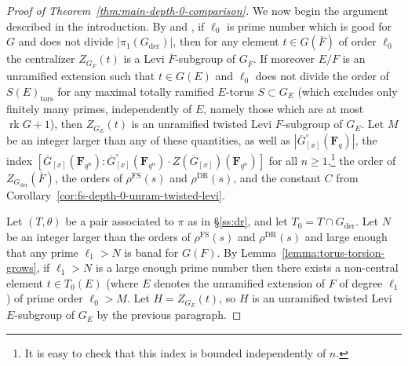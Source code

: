 \documentclass[reqno]{amsart}
\numberwithin{equation}{subsection}
\newcommand{\F}{\mathbf{F}}
\newcommand{\ol}[1]{\overline{#1}}
\DeclareMathOperator{\tors}{tors}
\DeclareMathOperator{\FS}{FS}
\DeclareMathOperator{\der}{der}
\DeclareMathOperator{\rk}{rk}
\DeclareMathOperator{\DR}{DR}
\theoremstyle{remark}
\numberwithin{equation}{subsection}
\numberwithin{figure}{subsection}
\begin{document}
\begin{proof}[Proof of Theorem~\ref{thm:main-depth-0-comparison}]
    We now begin the argument described in the introduction. By \cite[Proposition~2.1]{GH91} and \cite[Corollary~2.16(c)]{St75}, if $\ell_0$ is prime number which is good for $G$ and does not divide $|\pi_1(G_{\der})|$, then for any element $t \in G(\ol F)$ of order $\ell_0$ the centralizer $Z_{G_{\ol F}}(t)$ is a Levi $\ol F$-subgroup of $G_{\ol F}$. If moreover $E/F$ is an unramified extension such that $t \in G(E)$ and $\ell_0$ does not divide the order of $S(E)_{\tors}$ for any maximal totally ramified $E$-torus $S \subset G_E$ (which excludes only finitely many primes, independently of $E$, namely those which are at most $\rk G + 1$), then $Z_{G_E}(t)$ is an unramified twisted Levi $F$-subgroup of $G_E$. Let $M$ be an integer larger than any of these quantities, as well as $|\ol G_{[x]}^\circ(\F_q)|$, the index $[\ol G_{[x]}(\F_{q^n}): \ol G_{[x]}^\circ(\F_{q^n}) \cdot Z(\ol G_{[x]})(\F_{q^n})]$ for all $n \geq 1$,\footnote{It is easy to check that this index is bounded independently of $n$.} the order of $Z_{G_{\der}}(\ol F)$, the orders of $\rho^{\FS}(s)$ and $\rho^{\DR}(s)$, and the constant $C$ from Corollary~\ref{cor:fs-depth-0-unram-twisted-levi}.

    Let $(T, \theta)$ be a pair associated to $\pi$ as in \S\ref{ss:dr}, and let $T_0 = T \cap G_{\der}$. Let $N$ be an integer larger than the orders of $\rho^{\FS}(s)$ and $\rho^{\DR}(s)$ and large enough that any prime $\ell_1 > N$ is banal for $G(F)$. By Lemma~\ref{lemma:torus-torsion-grows}, if $\ell_1 > N$ is a large enough prime number then there exists a non-central element $t \in T_0(E)$ (where $E$ denotes the unramified extension of $F$ of degree $\ell_1$) of prime order $\ell_0 > M$. Let $H = Z_{G_E}(t)$, so $H$ is an unramified twisted Levi $E$-subgroup of $G_E$ by the previous paragraph.
    

\end{proof}
\end{document}
